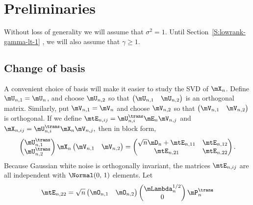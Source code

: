 \section{Preliminaries}\label{S:lowrank-preliminaries}

Without loss of generality we will assume that $\sigma^2 = 1$.  Until Section~\ref{S:lowrank-gamma-lt-1} , we will also assume that $\gamma \geq 1$.

\subsection{Change of basis}

A convenient choice of basis will make it easier to study the SVD of $\mX_n$.  Define $\mU_{n,1} = \mU_n$, and choose $\mU_{n,2}$ so that
\(
    \left( 
    \begin{matrix}
        \mU_{n,1} & \mU_{n,2}
    \end{matrix}
    \right)
\) 
is an orthogonal matrix. Similarly, put $\mV_{n,1} = \mV_n$ and choose
$\mV_{n,2}$ so that
\(
    \left(
    \begin{matrix}
        \mV_{n,1} & \mV_{n,2}
    \end{matrix}
    \right)
\)
is orthogonal.  If we define
\(
    \mtE_{n,ij} = \mU_{n,i}^\trans \mE_n \mV_{n,j}
\)
and
\(
    \mX_{n,ij} = \mU_{n,i}^\trans \mX_n \mV_{n,j},
\)
then in block form,
\[
    \left( 
    \begin{matrix}
        \mU_{n,1}^\trans \\
        \mU_{n,2}^\trans
    \end{matrix}
    \right)
    \mX_n
    \left(
    \begin{matrix}
        \mV_{n,1} & \mV_{n,2}
    \end{matrix}
    \right)
    =
    \left(
    \begin{matrix}
        \sqrt{n} \mD_n + \mtE_{n,11} & \mtE_{n,12} \\
        \mtE_{n,21}                  & \mtE_{n,22}
    \end{matrix}
    \right).
\]
Because Gaussian white noise is orthogonally invariant, the
matrices $\mtE_{n,ij}$ are all independent with \iid $\Normal(0, \, 1)$ elements.  Let
\[
    \mtE_{n,22}
    =
    \sqrt{n}
    \left(
    \begin{matrix}
        \mO_{n,1} & \mO_{n,2}
    \end{matrix}
    \right)
    \left(
    \begin{matrix}
        \mLambda_n^{1/2} \\
        0
    \end{matrix}
    \right)
    \mP_{n}^\trans
\]
